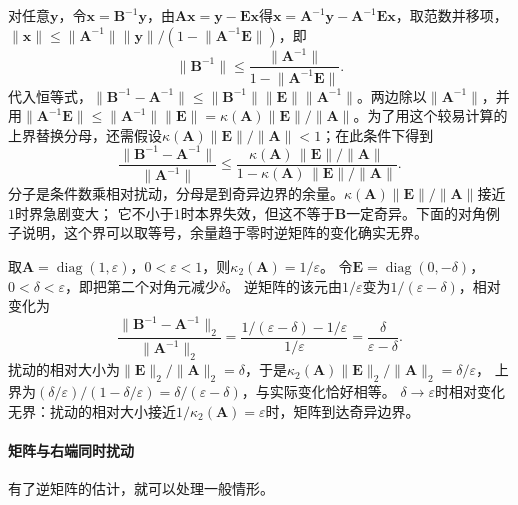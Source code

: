 对任意$\bm y$，令$\bm x=\bm B^{-1}\bm y$，由$\bm A\bm x=\bm y-\bm E\bm x$得$\bm x=\bm A^{-1}\bm y-\bm A^{-1}\bm E\bm x$，取范数并移项，$\lVert\bm x\rVert\leq\lVert\bm A^{-1}\rVert\lVert\bm y\rVert/(1-\lVert\bm A^{-1}\bm E\rVert)$，即
\[
 \lVert\bm B^{-1}\rVert\leq\frac{\lVert\bm A^{-1}\rVert}{1-\lVert\bm A^{-1}\bm E\rVert}.
\]
代入恒等式，$\lVert\bm B^{-1}-\bm A^{-1}\rVert\leq\lVert\bm B^{-1}\rVert\lVert\bm E\rVert\lVert\bm A^{-1}\rVert$。两边除以$\lVert\bm A^{-1}\rVert$，并用$\lVert\bm A^{-1}\bm E\rVert\leq\lVert\bm A^{-1}\rVert\lVert\bm E\rVert=\kappa(\bm A)\lVert\bm E\rVert/\lVert\bm A\rVert$。为了用这个较易计算的上界替换分母，还需假设$\kappa(\bm A)\lVert\bm E\rVert/\lVert\bm A\rVert<1$；在此条件下得到
\[
 \frac{\lVert\bm B^{-1}-\bm A^{-1}\rVert}
      {\lVert\bm A^{-1}\rVert}
 \leq
 \frac{\kappa(\bm A)\,\lVert\bm E\rVert/\lVert\bm A\rVert}
      {1-\kappa(\bm A)\,\lVert\bm E\rVert/\lVert\bm A\rVert}.
\]
分子是条件数乘相对扰动，分母是到奇异边界的余量。$\kappa(\bm A)\lVert\bm E\rVert/\lVert\bm A\rVert$接近$1$时界急剧变大；
它不小于$1$时本界失效，但这不等于$\bm B$一定奇异。下面的对角例子说明，这个界可以取等号，余量趋于零时逆矩阵的变化确实无界。

\begin{example}[接近奇异边界的对角矩阵]
\label{ex:ls-inverse-perturbation-diagonal}
取$\bm A=\operatorname{diag}(1,\varepsilon)$，$0<\varepsilon<1$，则$\kappa_2(\bm A)=1/\varepsilon$。
令$\bm E=\operatorname{diag}(0,-\delta)$，$0<\delta<\varepsilon$，即把第二个对角元减少$\delta$。
逆矩阵的该元由$1/\varepsilon$变为$1/(\varepsilon-\delta)$，相对变化为
\[
 \frac{\lVert\bm B^{-1}-\bm A^{-1}\rVert_2}{\lVert\bm A^{-1}\rVert_2}
 =\frac{1/(\varepsilon-\delta)-1/\varepsilon}{1/\varepsilon}
 =\frac{\delta}{\varepsilon-\delta}.
\]
扰动的相对大小为$\lVert\bm E\rVert_2/\lVert\bm A\rVert_2=\delta$，于是$\kappa_2(\bm A)\lVert\bm E\rVert_2/\lVert\bm A\rVert_2=\delta/\varepsilon$，
上界为$(\delta/\varepsilon)/(1-\delta/\varepsilon)=\delta/(\varepsilon-\delta)$，与实际变化恰好相等。
$\delta\to\varepsilon$时相对变化无界：扰动的相对大小接近$1/\kappa_2(\bm A)=\varepsilon$时，矩阵到达奇异边界。
\end{example}

\paragraph{矩阵与右端同时扰动}

有了逆矩阵的估计，就可以处理一般情形。

